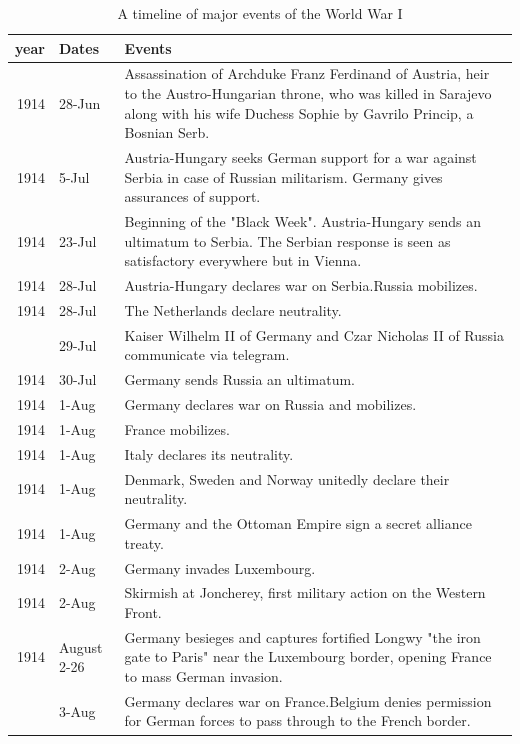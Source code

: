 \documentclass[
  openany]{book}
\begin{document}
\begin{longtable}[t]{rl>{\raggedright\arraybackslash}p{22em}}
\caption{\label{tab:world-wari-timeline}A timeline of major events of the World War I}\\
\toprule
year & Dates & Events\\
\midrule
\rowcolor{gray!6}  1914 & 28-Jun & Assassination of Archduke Franz Ferdinand of Austria, heir to the Austro-Hungarian throne, who was killed in Sarajevo along with his wife Duchess Sophie by Gavrilo Princip, a Bosnian Serb.\\
1914 & 5-Jul & Austria-Hungary seeks German support for a war against Serbia in case of Russian militarism. Germany gives assurances of support.\\
\rowcolor{gray!6}  1914 & 23-Jul & Beginning of the "Black Week". Austria-Hungary sends an ultimatum to Serbia. The Serbian response is seen as satisfactory everywhere but in Vienna.\\
1914 & 28-Jul & Austria-Hungary declares war on Serbia.Russia mobilizes.\\
\rowcolor{gray!6}  1914 & 28-Jul & The Netherlands declare neutrality.\\
\addlinespace
1914 & 29-Jul & Kaiser Wilhelm II of Germany and Czar Nicholas II of Russia communicate via telegram.\\
\rowcolor{gray!6}  1914 & 30-Jul & Germany sends Russia an ultimatum.\\
1914 & 1-Aug & Germany declares war on Russia and mobilizes.\\
\rowcolor{gray!6}  1914 & 1-Aug & France mobilizes.\\
1914 & 1-Aug & Italy declares its neutrality.\\
\addlinespace
\rowcolor{gray!6}  1914 & 1-Aug & Denmark, Sweden and Norway unitedly declare their neutrality.\\
1914 & 1-Aug & Germany and the Ottoman Empire sign a secret alliance treaty.\\
\rowcolor{gray!6}  1914 & 2-Aug & Germany invades Luxembourg.\\
1914 & 2-Aug & Skirmish at Joncherey, first military action on the Western Front.\\
\rowcolor{gray!6}  1914 & August 2-26 & Germany besieges and captures fortified Longwy "the iron gate to Paris" near the Luxembourg border, opening France to mass German invasion.\\
\addlinespace
1914 & 3-Aug & Germany declares war on France.Belgium denies permission for German forces to pass through to the French border.\\

\end{longtable}
\end{document}
